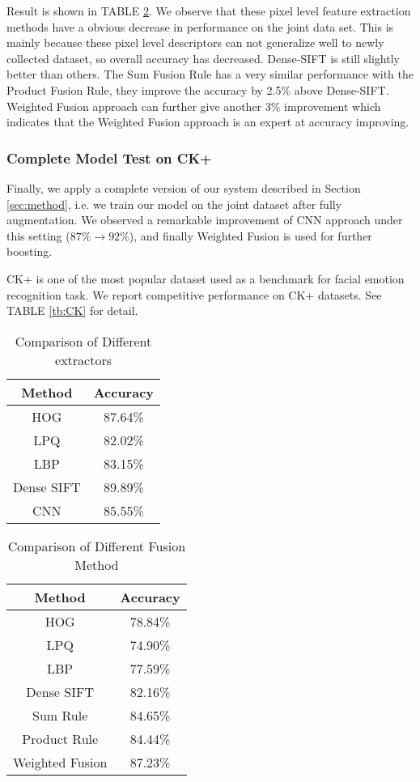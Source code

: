 \documentclass[conference]{IEEEtran}
\begin{document}
Result is shown in TABLE \ref{tb:fusion}. We observe that these pixel level feature extraction methods have a obvious decrease in performance on the joint data set. This is mainly because these pixel level descriptors can not generalize well to newly collected dataset, so overall accuracy has decreased. Dense-SIFT is still slightly better than others. The Sum Fusion Rule has a very similar performance with the Product Fusion Rule, they improve the accuracy by 2.5\% above Dense-SIFT. Weighted Fusion approach can further give another 3\% improvement which indicates that the Weighted Fusion approach is an expert at accuracy improving.

\subsubsection{Complete Model Test on CK+}
Finally, we apply a complete version of our system described in Section \ref{sec:method}, i.e. we train our model on the joint dataset after fully augmentation. We observed a remarkable improvement of CNN approach under this setting ($87\%\to92\%$), and finally Weighted Fusion is used for further boosting.

CK+ is one of the most popular dataset used as a benchmark for facial emotion recognition task. We report competitive performance on CK+ datasets. See TABLE \ref{tb:CK} for detail.
\begin{table}[!t]
\caption{Comparison of Different extractors}
\label{tb:feature}
\centering
\begin{tabular}{c|c}
\hline
Method & Accuracy\\
\hline
HOG & 87.64\%\\
\hline
LPQ & 82.02\%\\
\hline
LBP & 83.15\%\\
\hline
Dense SIFT & 89.89\%\\
\hline
CNN & 85.55\%\\
\hline
\end{tabular}
\end{table}

\begin{table}[!t]
\caption{Comparison of Different Fusion Method}
\label{tb:fusion}
\centering
\begin{tabular}{c|c}
\hline
Method & Accuracy\\
\hline
HOG & 78.84\%\\
\hline
LPQ & 74.90\%\\
\hline
LBP & 77.59\%\\
\hline
Dense SIFT & 82.16\%\\
\hline
Sum Rule & 84.65\%\\
\hline
Product Rule & 84.44\%\\
\hline
Weighted Fusion & 87.23\%\\
\hline
\end{tabular}
\end{table}
\end{document}
